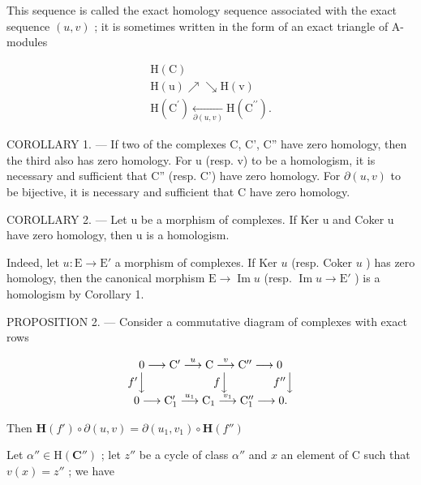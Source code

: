 This sequence is called the exact homology sequence associated with the exact sequence \((u, v)\) ; it is sometimes written in the form of an exact triangle of A-modules

\[
\begin{array}{c} \mathrm{H(C)} \\ \mathrm{H(u)} \nearrow \searrow \mathrm{H(v)} \\ \mathrm {H(C^ {\prime})} \xleftarrow [ \partial (u , v) ]{} \mathrm {H(C^{\prime\prime})}. \end{array}
\]

COROLLARY 1. --- If two of the complexes C, C', C'' have zero homology, then the third also has zero homology. For u (resp. v) to be a homologism, it is necessary and sufficient that C'' (resp. C') have zero homology. For \(\partial(u, v)\) to be bijective, it is necessary and sufficient that C have zero homology.

COROLLARY 2. --- Let u be a morphism of complexes. If Ker u and Coker u have zero homology, then u is a homologism.

Indeed, let \(u: \mathrm{E} \to \mathrm{E}'\) a morphism of complexes. If Ker \(u\) (resp. Coker \(u\) ) has zero homology, then the canonical morphism \(\mathrm{E} \to \operatorname{Im} u\) (resp. \(\operatorname{Im} u \to \mathrm{E}'\) ) is a homologism by Corollary 1.

PROPOSITION 2. — Consider a commutative diagram of complexes with exact rows

\[
\begin{array}{c} 0 \longrightarrow \mathrm{C} ^ {\prime} \stackrel {{u}} {{\longrightarrow}} \mathrm{C} \stackrel {{v}} {{\longrightarrow}} \mathrm{C} ^ {\prime \prime} \longrightarrow 0 \\ f ^ {\prime} \Big \downarrow \qquad \qquad \qquad f \Big \downarrow \qquad \qquad f ^ {\prime \prime} \Big \downarrow \\ 0 \longrightarrow \mathrm{C} _ {1} ^ {\prime} \stackrel {{u _ {1}}} {{\longrightarrow}} \mathrm{C} _ {1} \stackrel {{v _ {1}}} {{\longrightarrow}} \mathrm{C} _ {1} ^ {\prime \prime} \longrightarrow 0. \end{array}
\]

Then \(\mathbf{H}(f')\circ \partial (u,v) = \partial (u_1,v_1)\circ \mathbf{H}(f'')\)

Let \(\alpha'' \in \mathrm{H}(\mathbf{C}'')\) ; let \(z''\) be a cycle of class \(\alpha''\) and \(x\) an element of C such that \(v(x) = z''\) ; we have

